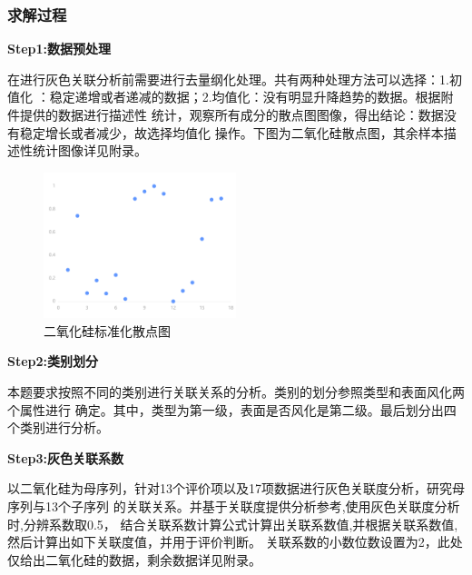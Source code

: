 \documentclass[UTF8]{ctexart}
\begin{document}
\subsubsection{求解过程}
\textbf{Step1:数据预处理}

在进行灰色关联分析前需要进行去量纲化处理。共有两种处理方法可以选择：1.初值化
：稳定递增或者递减的数据；2.均值化：没有明显升降趋势的数据。根据附件提供的数据进行描述性
统计，观察所有成分的散点图图像，得出结论：数据没有稳定增长或者减少，故选择均值化
操作。下图为二氧化硅散点图，其余样本描述性统计图像详见附录。
\begin{figure}[H]\centering
    \includegraphics[width=0.5\textwidth]{img/二氧化硅标准化散点图.png} %
    \caption{二氧化硅标准化散点图} %
    \label{fig:figure 3} %
\end{figure}

\textbf{Step2:类别划分}

本题要求按照不同的类别进行关联关系的分析。类别的划分参照类型和表面风化两个属性进行
确定。其中，类型为第一级，表面是否风化是第二级。最后划分出四个类别进行分析。

\textbf{Step3:灰色关联系数}

以二氧化硅为母序列，针对13个评价项以及17项数据进行灰色关联度分析，研究母序列与13个子序列
的关联关系。并基于关联度提供分析参考,使用灰色关联度分析时,分辨系数取0.5，
结合关联系数计算公式计算出关联系数值,并根据关联系数值,然后计算出如下关联度值，并用于评价判断。
关联系数的小数位数设置为2，此处仅给出二氧化硅的数据，剩余数据详见附录。
\end{document}
